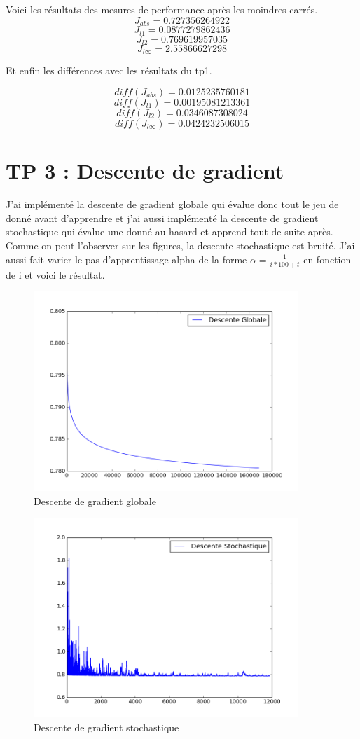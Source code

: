 \documentclass[a4paper,10pt]{report}
\begin{document}
Voici les résultats des mesures de performance après les moindres carrés.
$$J_{abs} = 0.727356264922$$
$$J_{l1} = 0.0877279862436 $$
$$J_{l2} = 0.769619957035$$
$$J_{l\infty} = 2.55866627298$$

Et enfin les différences avec les résultats du tp1.

$$diff(J_{abs}) =  0.0125235760181$$
$$diff(J_{l1}) = 0.00195081213361$$
$$diff(J_{l2}) =  0.0346087308024$$
$$diff(J_{l\infty}) = 0.0424232506015$$

\section{TP 3 : Descente de gradient }
J'ai implémenté la descente de gradient globale qui évalue donc tout le jeu de donné avant d'apprendre et 
j'ai aussi implémenté la descente de gradient stochastique qui évalue une donné au hasard et apprend tout de suite après.
Comme on peut l'observer sur les figures, la descente stochastique est bruité. 
J'ai aussi fait varier le pas d'apprentissage alpha de la forme $\alpha = \frac{1}{i*100+t}$ en fonction de i et voici le résultat.
\begin{figure}[H]
 \centering
 \caption{Descente de gradient globale}
 \includegraphics[width=10cm]{globale.png}
\end{figure}

\begin{figure}[H]
 \centering
 \caption{Descente de gradient stochastique}
 \includegraphics[width=10cm]{stochastique.png}
\end{figure}
\end{document}
